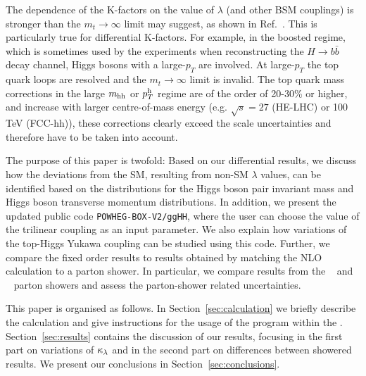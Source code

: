 The dependence of the K-factors on the value of $\lambda$ (and other BSM couplings) is stronger than the $m_t\to\infty$ limit may suggest, as shown in Ref.~\cite{Buchalla:2018yce}. This is particularly true for differential K-factors. For example, in the boosted regime, which is sometimes used by the experiments when reconstructing the $H \rightarrow b\bar{b}$ decay channel, Higgs bosons with a large-$p_T$ are involved. At large-$p_T$ the top quark loops are resolved and the $m_t\to\infty$ limit is invalid.
The top quark mass corrections in the large $m_{\mathrm{hh}}$ or $p_T^{\mathrm{h}}$ regime are of the order of 20-30\% or higher, and increase with larger centre-of-mass energy (e.g. $\sqrt{s}=27$ (HE-LHC) or 100\,TeV (FCC-hh)), these corrections clearly exceed the scale uncertainties and therefore have to be taken into account.

The purpose of this paper is twofold: Based on our differential results, we discuss how the deviations from the SM, resulting from non-SM $\lambda$ values, can be identified based on the distributions for the Higgs boson pair invariant mass and Higgs boson transverse momentum distributions. 
In addition, we present the updated public code {\tt POWHEG-BOX-V2/ggHH}, where the user can choose the value of the trilinear coupling as an input parameter.
We also explain how variations of the top-Higgs Yukawa coupling can be studied using this code.
Further, we compare the fixed order results to results obtained by matching the NLO calculation to a parton shower. In particular, we compare results from the \pythia~\cite{Sjostrand:2014zea} and \herwig~\cite{Bellm:2017bvx} parton showers and assess the parton-shower related uncertainties.

This paper is organised as follows. In Section~\ref{sec:calculation} we briefly describe the calculation and give instructions for the usage of the program within the \powhegbox. Section~\ref{sec:results} contains the discussion of our results, focusing in the first part on variations of $\kappa_{\lambda}$ and in the second part on differences between showered results. We present our conclusions in Section~\ref{sec:conclusions}.
